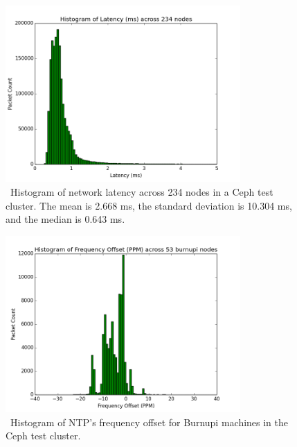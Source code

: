 \begin{figure}[h]
  \centering
  \caption{~Histogram of network latency across 234 nodes in a Ceph test cluster. The mean is 2.668 ms, the 
  standard deviation is 10.304 ms, and the median is 0.643 ms.} 
  \label{fig:latency-hist}
  \includegraphics[width=0.8\textwidth]{latency-hist.png}
\end{figure}

\begin{figure}[!htbp]
  \centering
  \caption{~Histogram of NTP's frequency offset for Burnupi machines in the Ceph test cluster.}
  \label{fig:burnupi-hist}
  \includegraphics[width=0.8\textwidth]{burnupi-freq-offset.png}
\end{figure}

